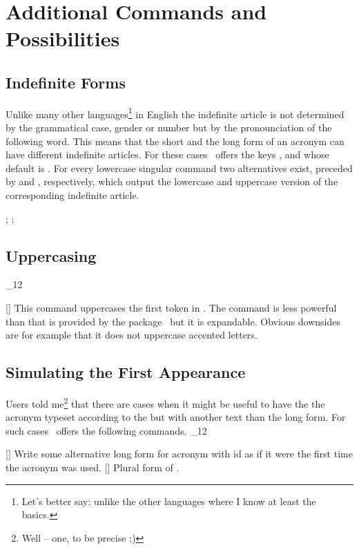 \documentclass[load-preamble+]{cnltx-doc}
\makeatletter
\renewenvironment{commands}
  {%
    \cnltx@set@catcode_{12}%
    \let\command\cnltx@command
    \cnltxlist
  }
  {\endcnltxlist}
\makeatother
\begin{document}
\section{Additional Commands and Possibilities}
\subsection{Indefinite Forms}
\noindent{}%
Unlike many other languages\footnote{Let's better say: unlike the other
  languages where I know at least the basics.} in English the indefinite
article is not determined by the grammatical case, gender or number but by the
pronounciation of the following word.  This means that the short and the long
form of an acronym can have different indefinite articles.  For these cases
\acro\ offers the keys ,  and
 whose default is .  For every lowercase
singular command two alternatives exist, preceded by  and ,
respectively, which output the lowercase and uppercase version of the
corresponding indefinite article.

\begin{example}
  ; ; 
\end{example}

\subsection{Uppercasing}
\begin{commands}
  \command{acfirstupper}[]
     This command uppercases the first token in .  The command is less powerful than  that is
     provided by the  package~\cite{pkg:mfirstuc} but it is
     expandable.  Obvious downsides are for example that it does not uppercase
     accented letters.
\end{commands}

\subsection{Simulating the First Appearance}
\noindent{}%
Users told me\footnote{Well -- one, to be precise ;)} that there are cases
when it might be useful to have the the acronym typeset according to the
 but with another text than the long form.  For such cases
\acro\ offers the following commands.
\begin{commands}
  \command{acflike}[\sarg{}]
    Write some alternative long form for acronym with \acs{id}  as if
    it were the first time the acronym was used.
  \command{acfplike}[\sarg{}]
    Plural form of .
\end{commands}
\end{document}
